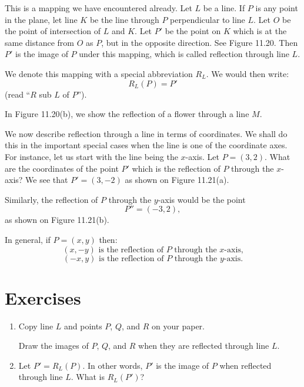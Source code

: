 \documentclass[12pt]{book} %
\begin{document}
\begin{ExerciseList}
This is a mapping we have encountered already. Let $L$ be a line. If $P$ is any point in the plane, let line $K$ be the line through $P$ perpendicular to line $L$. Let $O$ be the point of intersection of $L$ and $K$. Let $P'$ be the point on $K$ which is at the same distance from $O$ as $P$, but in the opposite direction. See Figure 11.20. Then $P'$ is the image of $P$ under this mapping, which is called reflection through line $L$.


We denote this mapping with a special abbreviation $R_L$. We would then write:
\[
R_L(P)=P'
\]
(read ``$R$ sub $L$ of $P$'').

In Figure 11.20(b), we show the reflection of a flower through a line $M$.

We now describe reflection through a line in terms of coordinates.
We shall do this in the important special cases when the line is one of the coordinate axes. For instance, let us start with the line being the $x$-axis. Let $P=(3,2)$. What are the coordinates of the point $P'$ which is the reflection of $P$ through the $x$-axis? We see that $P'=(3,-2)$ as shown on Figure 11.21(a).


Similarly, the reflection of $P$ through the $y$-axis would be the point
\[
P''=(-3,2),
\]
as shown on Figure 11.21(b).


In general, if $P=(x,y)$ then:
\[
(x,-y) \text{ is the reflection of } P \text{ through the } x\text{-axis,}
\]
\[
(-x,y) \text{ is the reflection of } P \text{ through the } y\text{-axis.}
\]

\section*{Exercises}

\setcounter{Exercise}{0}
\begin{ExerciseList}
\Exercise
\begin{enumerate}
\item[(a)] Copy line $L$ and points $P$, $Q$, and $R$ on your paper.


Draw the images of $P$, $Q$, and $R$ when they are reflected through line $L$.

\item[(b)] Let $P'=R_L(P)$. In other words, $P'$ is the image of $P$ when reflected through line $L$. What is $R_L(P')$?
\end{enumerate}


\end{ExerciseList}
\end{ExerciseList}
\end{document}
